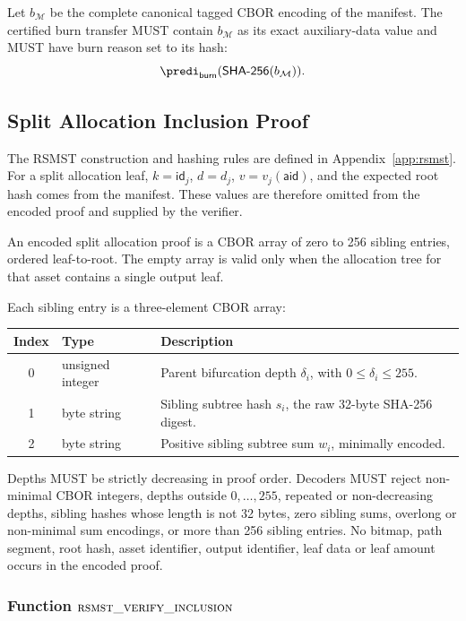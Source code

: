Let $b_\mathcal{M}$ be the complete canonical tagged CBOR encoding of the manifest. The certified burn transfer MUST contain $b_\mathcal{M}$ as its exact auxiliary-data value and MUST have burn reason set to its hash:
\[
\predi_\mathsf{burn}(\mathsf{SHA\text{-}256}(b_\mathcal{M})).
\]

\subsection{Split Allocation Inclusion Proof}\label{app:split-allocation-proof}

The RSMST construction and hashing rules are defined in Appendix~\ref{app:rsmst}.  For a split allocation leaf, $k=\mathsf{id}_j$, $d=d_j$, $v=v_j(\mathsf{aid})$, and the expected root hash comes from the manifest.  These values are therefore omitted from the encoded proof and supplied by the verifier.

An encoded split allocation proof is a CBOR array of zero to 256 sibling entries, ordered leaf-to-root.  The empty array is valid only when the allocation tree for that asset contains a single output leaf.

Each sibling entry is a three-element CBOR array:

\begin{longtable}{clp{9cm}}
\textbf{Index} & \textbf{Type} & \textbf{Description} \\
\hline
0 & unsigned integer & Parent bifurcation depth $\delta_i$, with $0\leq\delta_i\leq255$. \\
1 & byte string & Sibling subtree hash $s_i$, the raw 32-byte SHA-256 digest. \\
2 & byte string & Positive sibling subtree sum $w_i$, minimally encoded. \\
\end{longtable}

Depths MUST be strictly decreasing in proof order.  Decoders MUST reject non-minimal CBOR integers, depths outside $0,\ldots,255$, repeated or non-decreasing depths, sibling hashes whose length is not 32 bytes, zero sibling sums, overlong or non-minimal sum encodings, or more than 256 sibling entries.  No bitmap, path segment, root hash, asset identifier, output identifier, leaf data or leaf amount occurs in the encoded proof.

\subsubsection{Function $\textsc{rsmst\_verify\_inclusion}$}\label{sec:rsmst-split-verify}

